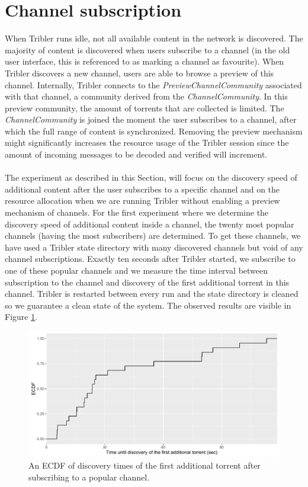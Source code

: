 \section{Channel subscription}
When Tribler runs idle, not all available content in the network is discovered. The majority of content is discovered when users subscribe to a channel (in the old user interface, this is referenced to as marking a channel as favourite). When Tribler discovers a new channel, users are able to browse a preview of this channel. Internally, Tribler connects to the \emph{PreviewChannelCommunity} associated with that channel, a community derived from the \emph{ChannelCommunity}. In this preview community, the amount of torrents that are collected is limited. The \emph{ChannelCommunity} is joined the moment the user subscribes to a channel, after which the full range of content is synchronized. Removing the preview mechanism might significantly increases the resource usage of the Tribler session since the amount of incoming messages to be decoded and verified will increment.\\\\
The experiment as described in this Section, will focus on the discovery speed of additional content after the user subscribes to a specific channel and on the resource allocation when we are running Tribler without enabling a preview mechanism of channels. For the first experiment where we determine the discovery speed of additional content inside a channel, the twenty most popular channels (having the most subscribers) are determined. To get these channels, we have used a Tribler state directory with many discovered channels but void of any channel subscriptions. Exactly ten seconds after Tribler started, we subscribe to one of these popular channels and we measure the time interval between subscription to the channel and discovery of the first additional torrent in this channel. Tribler is restarted between every run and the state directory is cleaned so we guarantee a clean state of the system. The observed results are visible in Figure \ref{fig:channel-subscription}.

\begin{figure}[!h]
	\centering
	\includegraphics[width=1.0\columnwidth]{images/experiments/channel_subscription}
	\caption{An ECDF of discovery times of the first additional torrent after subscribing to a popular channel.}
	\label{fig:channel-subscription}
\end{figure}

